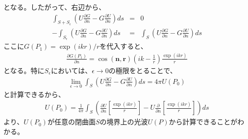\documentclass[a4paper,11pt,uplatex]{jsbook}
\begin{document}
となる。したがって、右辺から、
\begin{eqnarray}
  \int_{S+S_\epsilon} \left( U\frac{\partial G}{\partial n} - G\frac{\partial U}{\partial n}\right)ds &=& 0\\
  -\int_{S_\epsilon} \left( U\frac{\partial G}{\partial n} - G\frac{\partial U}{\partial n}\right) ds &=& 
  \int_S \left( U\frac{\partial G}{\partial n} - G\frac{\partial U}{\partial n}\right) ds
\end{eqnarray}
ここに$G(P_1) = \exp(ikr)/r$を代入すると、
\begin{eqnarray}
  \frac{\partial G(P_1)}{\partial n} = \cos(\bm{n},\bm{r})\left(ik - \frac{1}{r}\right)\frac{\exp(ikr)}{r}
\end{eqnarray}
となる。特に$S_\epsilon$においては、$\epsilon \rightarrow 0$の極限をとることで、
\begin{eqnarray}
  \lim_{\epsilon \rightarrow 0} \int_S \left( U\frac{\partial G}{\partial n} - G\frac{\partial U}{\partial n}\right)ds
   =4\pi U(P_0)
\end{eqnarray}
と計算できるから、
\begin{eqnarray}
  U(P_0) = \frac{1}{4\pi}\int_S \left( \frac{\partial U}{\partial n} \left[ \frac{\exp(ikr)}{r} \right] - U\frac{\partial}{\partial n} \left[ \frac{\exp(ikr)}{r}\right] \right) ds
\end{eqnarray}
より、$U(P_0)$が任意の閉曲面$S$の境界上の光波$U(P)$から計算できることがわかる。
\end{document}
